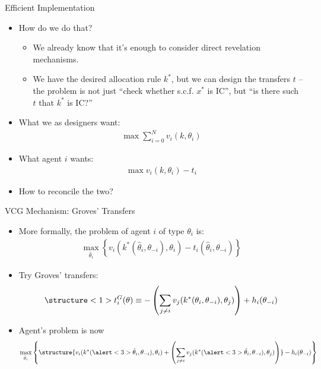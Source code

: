 \documentclass[english,10pt
,aspectratio=169
]{beamer}
\begin{document}
\begin{frame}{Efficient Implementation}
\begin{itemize}
	\item How do we do that?
	\begin{itemize}
		\item We already know that it's enough to consider direct revelation mechanisms.
		\item We have the desired allocation rule $k^*$, but we can design the transfers $t$ -- the problem is not just ``check whether s.c.f. $x^*$ is IC'', but ``is there such $t$ that $k^*$ is IC?''
	\end{itemize}
	\item What we as designers want:
	\vspace{-1em}\begin{align*}
	\max \sum_{i=0}^N v_i(k,\theta_i)
	\end{align*}
	\item What agent $i$ wants:
	\vspace{-1em}\begin{align*}
	\max v_i(k,\theta_i) - t_i
	\end{align*}
	\item How to reconcile the two?
\end{itemize}
\end{frame}


\begin{frame}{VCG Mechanism: Groves' Transfers}
\begin{itemize}
	\item More formally, the problem of agent $i$ of type $\theta_i$ is:
	\vspace{-0.5em}\begin{align*}
	\max_{\hat{\theta}_i} \left\{  v_i(k^*(\hat{\theta}_i,\theta_{-i}),\theta_i) - t_i(\hat{\theta}_i,\theta_{-i}) \right\}
	\end{align*}\vspace{-1em}
	\item Try \alert<1>{Groves' transfers}:
	\vspace{-0.5em}\begin{align*}
	\structure<1>{ t^G_{i}(\theta) \equiv -\left(\sum_{j\neq i} v_{j}(k^*(\theta_i, \theta_{-i}), \theta_{j}) \right) + h_{i}(\theta_{-i}) }
	\end{align*}\vspace{-1em}
	\item Agent's problem is now
	\vspace{-0.5em}\begin{align*}
	\max_{\hat{\theta}_i} \left\{ \structure{v_i(k^*(\alert<3>{\hat{\theta}_i},\theta_{-i}),\theta_i) + \left( \sum_{j\neq i} v_{j}(k^*(\alert<3>{\hat{\theta}_i},\theta_{-i}), \theta_{j}) \right)} - h_{i}(\theta_{-i}) \right\}
	\end{align*}
\end{itemize}
\end{frame}
\end{document}
